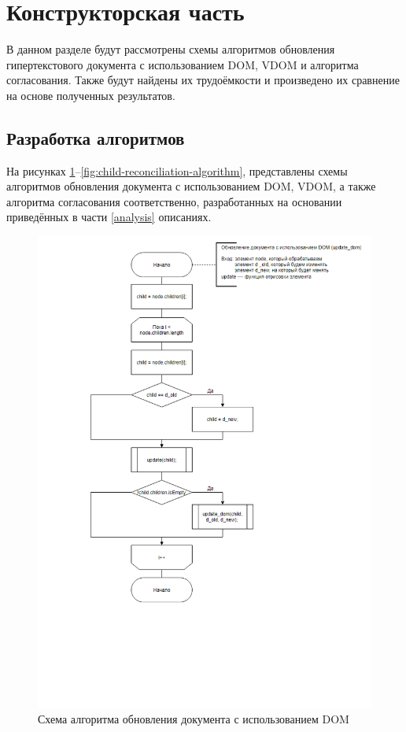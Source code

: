 \section{Конструкторская часть}

В данном разделе будут рассмотрены схемы алгоритмов обновления гипертекстового документа с использованием DOM, VDOM и алгоритма согласования. 
Также будут найдены их трудоёмкости и произведено их сравнение на основе полученных результатов.

\subsection{Разработка алгоритмов}

На рисунках \ref{fig:dom-algorithm}--\ref{fig:child-reconciliation-algorithm}, представлены схемы алгоритмов обновления документа с использованием DOM, VDOM, а также алгоритма согласования соответственно, разработанных на основании приведённых в части \ref{analysis} описаниях.

\begin{figure}[h]
	\centering
	\includegraphics[width=160mm]{img/dom-algorithm.png}
	\caption{Схема алгоритма обновления документа с использованием DOM}
	\label{fig:dom-algorithm}
\end{figure}

